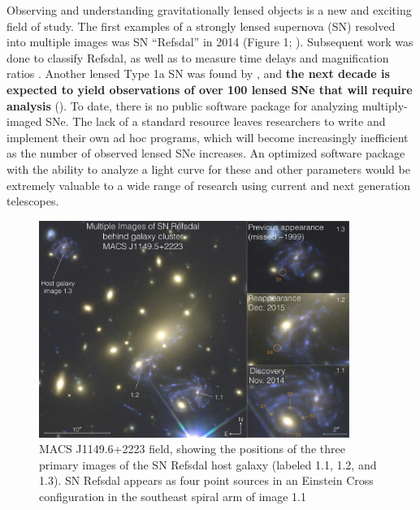 \thispagestyle{fancy}
\lhead{}
\rhead{}
\renewcommand{\headrulewidth}{1pt}
\renewcommand{\footrulewidth}{0pt}
\newcommand{\packageName}{\textit{SNTD}}
\renewcommand{\baselinestretch}{1.5} 

\fancyfoot[C]{}

\pagestyle{fancy}
Observing and understanding gravitationally lensed objects is a new
and exciting field of study. The first examples of a strongly lensed
supernova (SN) resolved into multiple images was SN ``Refsdal'' in
2014 (Figure 1; \citet{Kelly:2015a}). Subsequent work was done to
classify Refsdal, as well as to measure time delays and magnification
ratios \citep{Kelly:2016,Rodney:2016}. Another lensed Type 1a SN was found
by \cite{Goobar:2016}, and \textbf{the next decade is expected to yield observations
of over 100 lensed SNe that will require analysis} (\cite{Oguri:2010}).
To date, there is no public software package for analyzing multiply-imaged SNe. 
The lack of a standard resource leaves researchers to write and implement their 
own ad hoc programs, which will become increasingly inefficient as the number of
observed lensed SNe increases. 
An optimized software package with the ability to analyze a light curve for 
these and other parameters would be extremely valuable to a wide range of
 research using current and next generation telescopes.

\begin{figure}[h]
\centering
\includegraphics[width=0.9\textwidth]{refsdal_rodney.pdf}
\caption{
MACS J1149.6+2223 field, showing the positions of the three primary
images of the SN Refsdal host galaxy (labeled 1.1, 1.2, and 1.3). SN
Refsdal appears as four point sources in an Einstein Cross
configuration in the southeast spiral arm of image 1.1 \cite{Rodney:2016}}
\end{figure}


